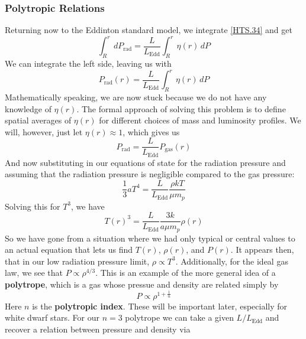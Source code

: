 \documentclass[10pt]{article}
\numberwithin{equation}{section}
\begin{document}
	\subsubsection{Polytropic Relations}
	Returning now to the Eddinton standard model, we integrate \eqref{HTS.34} and
get
	\begin{equation}
		\label{HTS.35} \int_R^rdP_{\mathrm{rad}}=\frac{L}{L_{\mathrm{Edd}}}
\int_R^r\eta(r)\,dP
	\end{equation}
	We can integrate the left side, leaving us with
	\begin{equation}
		\label{HTS.36} P_{\mathrm{rad}}(r)=\frac{L}{L_{\mathrm{Edd}}}
\int_R^r\eta(r)\,dP
	\end{equation}
	Mathematically speaking, we are now stuck because we do not have any 
knowledge of $\eta(r)$. The formal approach of solving this problem is to 
define spatial averages of $\eta(r)$ for different choices of mass and 
luminosity profiles. We will, however, just let $\eta(r)\approx 1$, which 
gives us
	\begin{equation}
		\label{HTS.37} P_{\mathrm{rad}}=\frac{L}{L_{\mathrm{Edd}}}P_
{\mathrm{gas}}(r)
	\end{equation}
	And now substituting in our equations of state for the radiation 
pressure and assuming that the radiation pressure is negligible compared to 
the gas pressure:
	\begin{equation}
		\label{HTS.38} \frac{1}{3}aT^4=\frac{L}{L_{\mathrm{Edd}}}\frac{\rho 
kT}{\mu m_p}
	\end{equation}
	Solving this for $T^3$, we have
	\begin{equation}
		\label{HTS.39} \boxed{T(r)^3=\frac{L}{L_{\mathrm{Edd}}}\frac{3k}{a
\mu m_p}\rho(r)}
	\end{equation}
	So we have gone from a situation where we had only typical or central 
values to an actual equation that lets us find $T(r)$, $\rho(r)$, and $P(r)
$. It appears then, that in our low radiation pressure limit, $\rho\propto 
T^3$. Additionally, for the ideal gas law, we see that $P\propto \rho^
{4/3}$. This is an example of the more general idea of a \textbf{polytrope}, which is a gas whose pressue and density are related simply by
\begin{equation}
	\label{eq:polytrope} P\propto \rho^{1+\frac{1}{n}}
\end{equation}
Here $n$ is the \textbf{polytropic index}. These will be important later,
especially for white dwarf stars. For our $n=3$ polytrope we can take a given
$L/L_{\mathrm{Edd}}$ and recover a relation between pressure and density via
\end{document}
